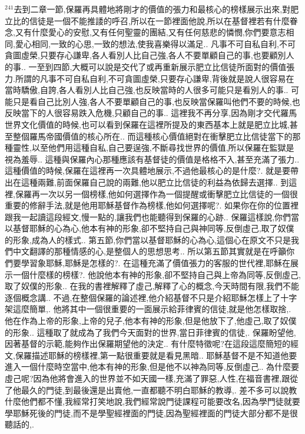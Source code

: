\documentclass{book}
\begin{document}
$^{241}$去到二章一節,保羅再具體地將剛才的價值的張力和最核心的榜樣展示出來,對肥立比的信徒是一個不能推諉的呼召,所以在一節裡面他說,所以在基督裡若有什麼眷念,又有什麼愛心的安慰,又有任何聖靈的團結,又有任何慈悲的憐憫,你們要意志相同,愛心相同,一致的心思,一致的想法,使我喜樂得以滿足..
凡事不可自私自利,不可貪圖虛榮,只要存心謙卑,各人看別人比自己強,各人不要單顧自己的事,也要顧別人的事..
一至到四節,大概可以說是交代了或再重新展示肥立比信徒所面對的價值張力.所謂的凡事不可自私自利,不可貪圖虛榮,只要存心謙卑,背後就是說人很容易在當時驕傲,自誇,各人看別人比自己強,也反映當時的人很多可能只是看別人的事..
可能只是看自己比別人強,各人不要單顧自己的事,也反映當保羅叫他們不要的時候,也反映當下的人很容易跌入危機,只顧自己的事..
這裡我不再分享,因為剛才交代羅馬世界文化價值的時候,也可以看到保羅在這裡所提及的東西基本上就是肥立比城,甚至整個羅馬帝國價值的核心所在..
而這種核心價值絕對在衝擊肥立比信徒當下的那種靈性,以至他們用這種自私,自己要逞強,不斷尋找世界的價值,所以保羅在監獄是視為羞辱..
這種與保羅內心那種應該有基督徒的價值是格格不入,甚至充滿了張力..
這種價值的時候,保羅在這裡再一次具體地展示,不過他最核心的是什麼?.
就是要帶出在這種兩難,前面保羅自己說的兩難,他以肥立比信徒的利益為依歸去選擇..
到這裡,保羅再一次以另一個榜樣,他如何選擇作為一個提醒或衝擊肥立比信徒的一個很重要的修辭手法,就是他用耶穌基督作為榜樣,他如何選擇呢?.
如果你在你的位置裡跟我一起讀這段經文,慢一點的,讓我們也能聽得到保羅的心跡..
保羅這樣說,你們當以基督耶穌的心為心,他本有神的形象,卻不堅持自己與神同等,反倒虛己,取了奴僕的形象,成為人的樣式..
第五節,你們當以基督耶穌的心為心,這個心在原文不只是我們中文翻譯的那種情感的心,是整個人的思想思考..
所以第五節其實就是在呼籲你們要學習象耶穌,耶穌是怎樣的?.
在這種充滿了價值張力的客服的世代裡,耶穌在展示一個什麼樣的榜樣?.
他說他本有神的形象,卻不堅持自己與上帝為同等,反倒虛己,取了奴僕的形象..
在我的書裡解釋了虛己,解釋了心的概念,今天時間有限,我們不能逐個概念講..
不過,在整個保羅的論述裡,他介紹基督不只是介紹耶穌怎樣上了十字架這麼簡單,.
他將其中一個很重要的一面展示給菲律賓的信徒,就是他怎樣取捨,.
他在作為上帝的形象,上帝的兒子,他本有神的形象,但是他放下了,他虛己,取了奴僕的形象..
這種取了就成為了我們今天面對的世界,當日菲律賓的信徒,.
保羅盼望他,因著基督的示範,能夠作出保羅期望他的決定..
有什麼特徵呢?在這段這麼簡短的經文,保羅描述耶穌的榜樣裡,第一點很重要就是看見黑暗..
耶穌基督不是不知道他要進入一個什麼時空當中,他本有神的形象,但是他不以神為同等,反倒虛己..
為什麼要虛己呢?因為他將會進入的世界並不如天國一樣,充滿了罪惡,人性,在福音書裡,跟從了他最久的門徒,到最後還是出賣他,一直都聽不明白耶穌的教導,.
差不多可以說教什麼他們都不懂,我經常打笑地說,我們經常說門徒課程可能要改名,因為學門徒就要學耶穌死後的門徒,而不是學聖經裡面的門徒,因為聖經裡面的門徒大部分都不是很聽話的,.
\end{document}

